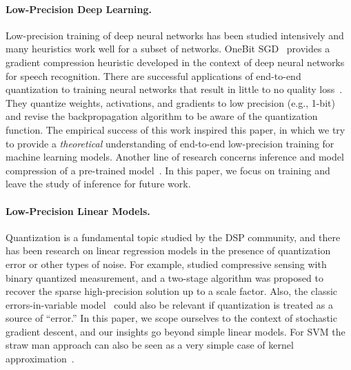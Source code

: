 \documentclass{article}
\begin{document}
\vspace{-1em}
\paragraph{Low-Precision Deep Learning.}

Low-precision training of deep neural networks has been studied
intensively and many heuristics work well for a subset of networks.
OneBit SGD~\cite{Frank:2014:Interspeech} provides
a gradient compression heuristic developed in the context of deep 
neural networks for speech recognition. There are successful 
applications of end-to-end quantization to training neural networks that 
result in little to no quality loss~\cite{hubara2016quantized,
rastegari2016xnor,zhou2016dorefa,miyashita2016convolutional,li2016ternary,gupta2015deep}. They quantize weights, activations, and gradients 
to low precision (e.g., 1-bit) and revise the backpropagation 
algorithm to be aware of the quantization function.
The empirical success of this work inspired this paper, in which we try
to provide a {\em theoretical} understanding of end-to-end low-precision
training for machine learning models.
Another line of research concerns inference and model
compression of a pre-trained model~\cite{vanhoucke2011improving,gong2014compressing,Han:2016:ICLR,lin2016fixed,kim2016bitwise,kim2015compression,wu2016quantized}.
In this paper, we focus on training and leave the study of
inference for future work.

\vspace{-1.2em}
\paragraph{Low-Precision Linear Models.}

Quantization is a fundamental topic studied by the
DSP community, and there has been research on
linear regression models in the presence of quantization
error or other types of noise. For example,
\citet{Gopi:2013:ICML} studied compressive sensing
with binary quantized measurement, and a two-stage algorithm was proposed to recover the sparse high-precision solution up to a scale factor.
Also, the
classic errors-in-variable model~\cite{Hall:2008:Book}
could also be relevant if quantization is treated 
as a source of ``error.'' In this paper, we scope
ourselves to the context of stochastic gradient descent, 
and our insights go beyond simple linear models.
For SVM the straw man approach 
can also be seen as a very simple case of kernel 
approximation~\cite{Cortes:2010:AISTATS}.
\end{document}
